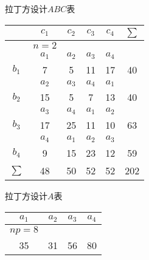 
\begin{margintable}
  \centering
  \caption{拉丁方设计$ABC$表}

    \begin{tabular}{ccccc|c}
    \toprule
          & $c_1$ & $c_2$ & $c_3$ & $c_4$ & $\sum$ \\
    \midrule
          & $n=2$ &       &       &       &  \\
          & $a_1$ & $a_2$ & $a_3$ & $a_4$ &  \\
    $b_1$ & \cellcolor[rgb]{ .886,  .937,  .855}7 & \cellcolor[rgb]{ .886,  .937,  .855}5 & \cellcolor[rgb]{ .886,  .937,  .855}11 & \cellcolor[rgb]{ .886,  .937,  .855}17 & \cellcolor[rgb]{ 1,  .949,  .8}40 \\
          & $a_2$ & $a_3$ & $a_4$ & $a_1$ &  \\
    $b_2$ & \cellcolor[rgb]{ .886,  .937,  .855}15 & \cellcolor[rgb]{ .886,  .937,  .855}5 & \cellcolor[rgb]{ .886,  .937,  .855}7 & \cellcolor[rgb]{ .886,  .937,  .855}13 & \cellcolor[rgb]{ 1,  .949,  .8}40 \\
          & $a_3$ & $a_4$ & $a_1$ & $a_2$ &  \\
    $b_3$ & \cellcolor[rgb]{ .886,  .937,  .855}17 & \cellcolor[rgb]{ .886,  .937,  .855}25 & \cellcolor[rgb]{ .886,  .937,  .855}11 & \cellcolor[rgb]{ .886,  .937,  .855}10 & \cellcolor[rgb]{ 1,  .949,  .8}63 \\
          & $a_4$ & $a_1$ & $a_2$ & $a_3$ &  \\
    $b_4$ & \cellcolor[rgb]{ .886,  .937,  .855}9 & \cellcolor[rgb]{ .886,  .937,  .855}15 & \cellcolor[rgb]{ .886,  .937,  .855}23 & \cellcolor[rgb]{ .886,  .937,  .855}12 & \cellcolor[rgb]{ 1,  .949,  .8}59 \\
    $\sum$ & \cellcolor[rgb]{ .839,  .863,  .894}48 & \cellcolor[rgb]{ .839,  .863,  .894}50 & \cellcolor[rgb]{ .839,  .863,  .894}52 & \cellcolor[rgb]{ .839,  .863,  .894}52 & \cellcolor[rgb]{ .867,  .922,  .969}202 \\
    \bottomrule
    \end{tabular}

\end{margintable}


\begin{margintable}
  \centering
  \caption{拉丁方设计$A$表}
    \begin{tabular}{cccc}
    \toprule
    \multicolumn{1}{c}{$a_1$} & \multicolumn{1}{c}{$a_2$} & \multicolumn{1}{c}{$a_3$} & \multicolumn{1}{c}{$a_4$} \\
    \midrule
    \multicolumn{1}{l}{$np=8$} &       &       &  \\
    \rowcolor[rgb]{ .957,  .69,  .518} 35    & 31    & 56    & 80 \\
    \bottomrule
    \end{tabular}
\end{margintable}

